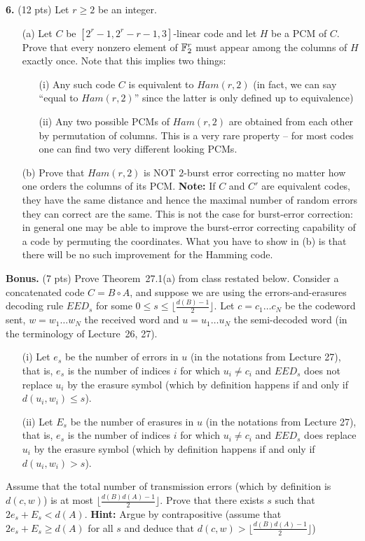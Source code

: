 \documentclass[12pt]{amsart}
\begin{document}
{\bf 6.} (12 pts) Let $r\geq 2$ be an integer.
\begin{itemize}
\item[(a)] Let $C$ be $[2^r-1,2^r-r-1,3]$-linear code and let $H$ be a PCM of $C$. Prove that every nonzero element of ${\mathbb F}_2^r$ must appear among the columns of $H$ exactly once. Note that this implies two things:
\begin{itemize}
\item[(i)] Any such code $C$ is equivalent to $Ham(r,2)$ (in fact, we can say ``equal to $Ham(r,2)$'' since the latter is only defined up to equivalence)
\item[(ii)] Any two possible PCMs of $Ham(r,2)$ are obtained from each other by permutation of columns. This is a very rare property -- for most codes one can find two very different looking PCMs. 
\end{itemize}
\item[(b)] Prove that $Ham(r,2)$ is NOT $2$-burst error correcting no matter how one orders the columns of its PCM. {\bf Note:}
If $C$ and $C'$ are equivalent codes, they have the same distance and hence the maximal number of random errors they can correct are the same. This is not the case for burst-error correction: in general one may be able to improve the burst-error correcting capability of a code by permuting the coordinates. What you have to show in (b) is that there will be no such improvement for the Hamming code.
\end{itemize}

{\bf Bonus.} (7 pts) Prove Theorem~27.1(a) from class restated below. Consider a concatenated code $C=B\circ A$, and suppose we are
using the errors-and-erasures decoding rule $EED_s$ for some $0\leq s\leq \lfloor \frac{d(B)-1}{2}\rfloor$. Let
$c=c_1\ldots c_N$ be the codeword sent, $w=w_1\ldots w_N$ the received word and $u=u_1\ldots u_N$ the semi-decoded word (in the terminology of Lecture~26, 27).
\begin{itemize}
\item[(i)] Let $e_s$ be the number of errors in $u$ (in the notations from Lecture 27), that is, $e_s$ is the number of indices $i$ for which $u_i\neq c_i$ and $EED_s$ does not replace $u_i$ by the erasure symbol (which by definition happens if and only if $d(u_i,w_i)\leq s$).
\item[(ii)] Let $E_s$ be the number of erasures in $u$ (in the notations from Lecture 27), that is, $e_s$ is the number of indices $i$ for which $u_i\neq c_i$ and $EED_s$ does replace $u_i$ by the erasure symbol (which by definition happens if and only if $d(u_i,w_i)> s$).
\end{itemize}
Assume that the total number of transmission errors (which by definition is $d(c,w)$) is at most $ \lfloor \frac{d(B)d(A)-1}{2}\rfloor$.
Prove that there exists $s$ such that $2e_s + E_s < d(A)$.
{\bf Hint:} Argue by contrapositive (assume that $2e_s + E_s \geq  d(A)$ for all $s$ and deduce that $d(c,w)> \lfloor\frac{d(B)d(A)-1}{2}\rfloor $) 
\end{document}
